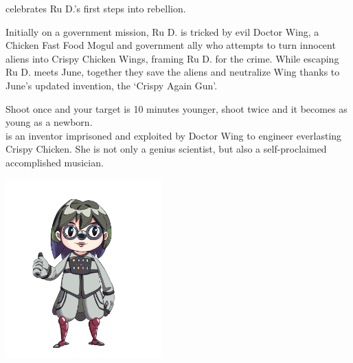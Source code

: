 \clearpage 
{}

 celebrates Ru D.'s first steps into rebellion. 

Initially on a government mission, Ru D. is tricked by evil Doctor Wing, a Chicken Fast Food Mogul and government ally who attempts to turn innocent aliens into Crispy Chicken Wings, framing Ru D. for the crime. While escaping Ru D. meets June, together they save the aliens and neutralize Wing thanks to June's updated invention, the `Crispy Again Gun'.

Shoot once and your target is 10 minutes younger, shoot twice and it becomes as young as a newborn.\\

 is an inventor imprisoned and exploited by Doctor Wing to engineer everlasting Crispy Chicken. She is not only a genius scientist, but also a self-proclaimed accomplished musician.

\begin{center}
\includegraphics[width=0.45\textwidth]{Assets/june}
\end{center}



\clearpage